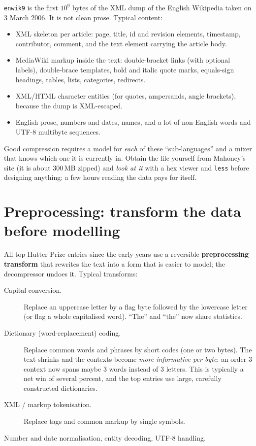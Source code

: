 \documentclass[11pt,a4paper,openany]{book}
\newcommand{\code}[1]{\texttt{#1}}
\theoremstyle{definition}
\theoremstyle{remark}
\begin{document}
\code{enwik9} is the first $10^9$ bytes of the XML dump of the English Wikipedia taken on 3 March 2006. It is not clean prose. Typical content:
\begin{itemize}
\item XML skeleton per article: page, title, id and revision elements, timestamp, contributor, comment, and the text element carrying the article body.
\item MediaWiki markup inside the text: double-bracket links (with optional labels), double-brace templates, bold and italic quote marks, equals-sign headings, tables, lists, categories, redirects.
\item XML/HTML character entities (for quotes, ampersands, angle brackets), because the dump is XML-escaped.
\item English prose, numbers and dates, names, and a lot of non-English words and UTF-8 multibyte sequences.
\end{itemize}
Good compression requires a model for \emph{each} of these ``sub-languages'' and a mixer that knows which one it is currently in. Obtain the file yourself from Mahoney's site (it is about 300\,MB zipped) and \emph{look at it} with a hex viewer and \code{less} before designing anything: a few hours reading the data pays for itself.

\section{Preprocessing: transform the data before modelling}

All top Hutter Prize entries since the early years use a reversible \textbf{preprocessing transform} that rewrites the text into a form that is easier to model; the decompressor undoes it. Typical transforms:
\begin{description}
\item[Capital conversion.] Replace an uppercase letter by a flag byte followed by the lowercase letter (or flag a whole capitalised word). ``The'' and ``the'' now share statistics.
\item[Dictionary (word-replacement) coding.] Replace common words and phrases by short codes (one or two bytes). The text shrinks and the contexts become \emph{more informative per byte}: an order-3 context now spans maybe 3 words instead of 3 letters. This is typically a net win of several percent, and the top entries use large, carefully constructed dictionaries.
\item[XML / markup tokenisation.] Replace tags and common markup by single symbols.
\item[Number and date normalisation, entity decoding, UTF-8 handling.]
\end{description}
\end{document}

